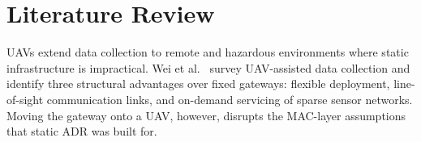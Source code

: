 \section{Literature Review} \label{sec:lit}

UAVs extend data collection to remote and hazardous environments where static infrastructure
is impractical. Wei et al.~\cite{wei2022uav} survey UAV-assisted data collection and
identify three structural advantages over fixed gateways: flexible deployment, line-of-sight communication links, and on-demand servicing of sparse sensor networks. Moving the gateway onto a UAV, however, disrupts the MAC-layer assumptions that static ADR was built for.







